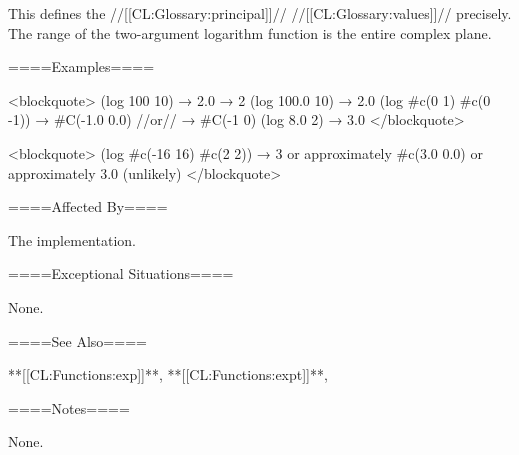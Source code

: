 This defines the //[[CL:Glossary:principal]]// //[[CL:Glossary:values]]// precisely. The range of the two-argument logarithm function is the entire complex plane.

====Examples====

<blockquote> (log 100 10) → 2.0 → 2 (log 100.0 10) → 2.0 (log #c(0 1) #c(0 -1)) → #C(-1.0 0.0) //or// → #C(-1 0) (log 8.0 2) → 3.0 </blockquote>

<blockquote> (log #c(-16 16) #c(2 2)) → 3 or approximately #c(3.0 0.0) or approximately 3.0 (unlikely) </blockquote>

====Affected By====

The implementation.

====Exceptional Situations====

None.

====See Also====

**[[CL:Functions:exp]]**, **[[CL:Functions:expt]]**, {\secref\FloatSubstitutability}

====Notes====

None.

   
